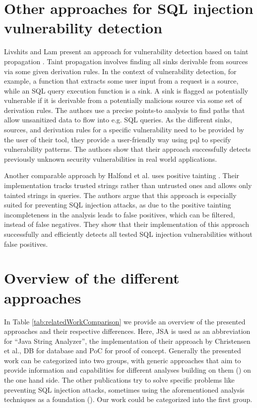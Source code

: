 \section{Other approaches for SQL injection vulnerability detection}\label{sec:related:otherSQL}

Livshits and Lam present an approach for vulnerability detection based on taint propagation \cite{livshits2005}.
Taint propagation involves finding all sinks derivable from sources via some given derivation rules. In the context of vulnerability detection, for example, a function that extracts some user input from a request is a source, while an SQL query execution function is a sink. A sink is flagged as potentially vulnerable if it is derivable from a potentially malicious source via some set of derivation rules. The authors use a precise points-to analysis to find paths that allow unsanitized data to flow into e.g. SQL queries.
As the different sinks, sources, and derivation rules for a specific vulnerability need to be provided by the user of their tool, they provide a user-friendly way using \ac{pql} to specify vulnerability patterns. 
The authors show that their approach successfully detects previously unknown security vulnerabilities in real world applications.

Another comparable approach by Halfond et al. uses positive tainting \cite{wasp}. Their implementation tracks trusted strings rather than untrusted ones and allows only tainted strings in queries. The authors argue that this approach is especially suited for preventing SQL injection attacks, as due to the positive tainting incompleteness in the analysis leads to false positives, which can be filtered, instead of false negatives. They show that their implementation of this approach successfully and efficiently detects all tested SQL injection vulnerabilities without false positives.

\section{Overview of the different approaches}

In Table \ref{tab:relatedWorkComparison} we provide an overview of the presented approaches and their respective differences. Here, JSA is used as an abbreviation for \enquote{Java String Analyzer}, the implementation of their approach by Christensen et al., DB for database and PoC for proof of concept. Generally the presented work can be categorized into two groups, with generic approaches that aim to provide information and capabilities for different analyses building on them (\cite{brics,banshee,regex_types}) on the one hand side. The other publications try to solve specific problems like preventing SQL injection attacks, sometimes using the aforementioned analysis techniques as a foundation (\cite{gould2004static,amnesia,wasp,xduce,xact,livshits2005,sqli_wassermann_su}). Our work could be categorized into the first group.

